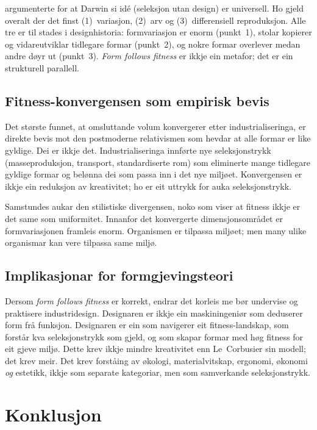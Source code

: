 \documentclass[12pt,a4paper]{article}
\begin{document}
\citet{dennett1995} argumenterte for at Darwin si id\'e (seleksjon utan design) er universell. Ho gjeld overalt der det finst (1)~variasjon, (2)~arv og (3)~differensiell reproduksjon. Alle tre er til stades i designhistoria: formvariasjon er enorm (punkt~1), stolar kopierer og vidareutviklar tidlegare formar (punkt~2), og nokre formar overlever medan andre d\o{}yr ut (punkt~3). \emph{Form follows fitness} er ikkje ein metafor; det er ein strukturell parallell.

\subsection{Fitness-konvergensen som empirisk bevis}

Det st\o{}rste funnet, at omsluttande volum konvergerer etter industrialiseringa, er direkte bevis mot den postmoderne relativismen som hevdar at alle formar er like gyldige. Dei er ikkje det. Industrialiseringa innf\o{}rte nye seleksjonstrykk (masseproduksjon, transport, standardiserte rom) som eliminerte mange tidlegare gyldige formar og belønna dei som passa inn i det nye milj\o{}et. Konvergensen er ikkje ein reduksjon av kreativitet; ho er eit uttrykk for auka seleksjonstrykk.

Samstundes aukar den stilistiske divergensen, noko som viser at fitness ikkje er det same som uniformitet. Innanfor det konvergerte dimensjonsomr\aa{}det er formvariasjonen framleis enorm. Organismen er tilpassa milj\o{}et; men many ulike organismar kan vere tilpassa same milj\o{}.

\subsection{Implikasjonar for formgjevingsteori}

Dersom \emph{form follows fitness} er korrekt, endrar det korleis me b\o{}r undervise og praktisere industridesign. Designaren er ikkje ein maskin\-ingeni\o{}r som deduserer form fr\aa{} funksjon. Designaren er ein som navigerer eit fitness-landskap, som forst\aa{}r kva seleksjonstrykk som gjeld, og som skapar formar med h\o{}g fitness for eit gjeve milj\o{}. Dette krev ikkje mindre kreativitet enn Le~Corbusier sin modell; det krev meir. Det krev forst\aa{}ing av \o{}kologi, materialvitskap, ergonomi, \o{}konomi \emph{og} estetikk, ikkje som separate kategoriar, men som samverkande seleksjonstrykk.

\section{Konklusjon}
\end{document}
